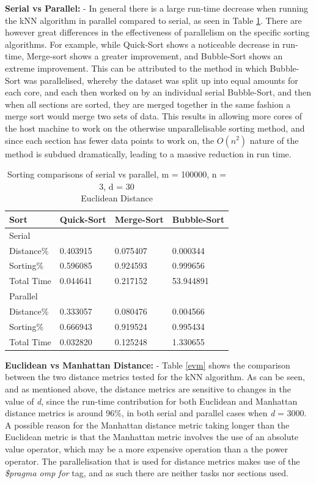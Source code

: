 \documentclass[a4paper,twoside,11pt]{report}
\begin{document}
\textbf{Serial vs Parallel:} - In general there is a large run-time decrease when running the kNN algorithm in parallel compared to serial, as seen in Table \ref{svp}. There are however great differences in the effectiveness of parallelism on the specific sorting algorithms. For example, while Quick-Sort shows a noticeable decrease in run-time, Merge-sort shows a greater improvement, and Bubble-Sort shows an extreme improvement. This can be attributed to the method in which Bubble-Sort was parallelised, whereby the dataset was split up into equal amounts for each core, and each then worked on by an individual serial Bubble-Sort, and then when all sections are sorted, they are merged together in the same fashion a merge sort would merge two sets of data. This results in allowing more cores of the host machine to work on the otherwise unparallelisable sorting method, and since each section has fewer data points to work on, the $O(n^2)$ nature of the method is subdued dramatically, leading to a massive reduction in run time.

\begin{table}[h]
	\centering
	\begin{tabular}{llll}
		\hline
		Sort       & Quick-Sort & Merge-Sort & Bubble-Sort \\ \hline \hline
		Serial     &            &            &             \\ \hline
		Distance\% & 0.403915   & 0.075407   & 0.000344    \\
		Sorting\%  & 0.596085   & 0.924593   & 0.999656    \\
		Total Time & 0.044641   & 0.217152   & 53.944891   \\ \hline
		Parallel   &            &            &             \\ \hline
		Distance\% & 0.333057   & 0.080476   & 0.004566    \\
		Sorting\%  & 0.666943   & 0.919524   & 0.995434    \\
		Total Time & 0.032820   & 0.125248   & 1.330655   \\ \hline
	\end{tabular}
	\caption{Sorting comparisons of serial vs parallel, m = 100000, n = 3, d = 30\\
	Euclidean Distance}
	\label{svp}
\end{table}

\textbf{Euclidean vs Manhattan Distance: } - Table \ref{evm} shows the comparison between the two distance metrics tested for the kNN algorithm. As can be seen, and as mentioned above, the distance metrics are sensitive to changes in the value of \textit{d}, since the run-time contribution for both Euclidean and Manhattan distance metrics is around 96\%, in both serial and parallel cases when \textit{d} = 3000. A possible reason for the Manhattan distance metric taking longer than the Euclidean metric is that the Manhattan metric involves the use of an absolute value operator, which may be a more expensive operation than a the power operator. The parallelisation that is used for distance metrics makes use of the \textit{\$pragma omp for} tag, and as such there are neither tasks nor sections used.
\end{document}
